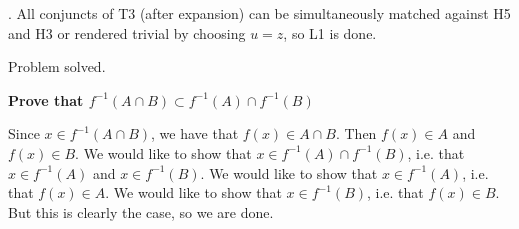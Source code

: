 \documentclass[a4paper,twoside,12pt]{article} %
\makeatletter
\DeclareRobustCommand{\_}{%
  \leavevmode\vbox{%
    \hrule\@width.4em
          \@height-.16ex
          \@depth\dimexpr.16ex+.28pt\relax}}
\newenvironment{fit}{\begin{adjustbox}{max width=\textwidth,max totalheight=\textheight,keepaspectratio}}{\end{adjustbox}}
\makeatother
\begin{document}
\begin{steps}
. All conjuncts of T3 (after expansion) can be simultaneously matched against H5 and H3 or rendered trivial by choosing $u = z$, so L1 is done.\nopagebreak[4] 
\nopagebreak[4] 
\smallskip\nopagebreak[4] 

\begin{fit}%
\end{fit}

Problem solved.
\cleardoublepage

\end{steps}
{\begin{center} \large \textbf{Prove that $f^{-1}(A \cap B) \subset f^{-1}(A) \cap f^{-1}(B)$}\end{center}}\nopagebreak[4]

\begin{center}
\begin{minipage}{120mm}
Since $x\in f^{-1}(A\cap B)$, we have that $f(x)\in A\cap B$. Then $f(x)\in A$ and $f(x)\in B$. We would like to show that $x\in f^{-1}(A)\cap f^{-1}(B)$, i.e. that $x\in f^{-1}(A)$ and $x\in f^{-1}(B)$. We would like to show that $x\in f^{-1}(A)$, i.e. that $f(x)\in A$. We would like to show that $x\in f^{-1}(B)$, i.e. that $f(x)\in B$. But this is clearly the case, so we are done.
\end{minipage}
\end{center}
\end{document}
